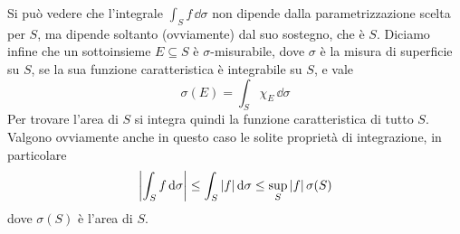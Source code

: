 Si può vedere che l'integrale $\int_Sf\,\dd\sigma$ non dipende dalla parametrizzazione scelta per $S$, ma dipende soltanto (ovviamente) dal suo sostegno, che è $S$.
Diciamo infine che un sottoinsieme $E\subseteq S$ è $\sigma$-misurabile, dove $\sigma$ è la misura di superficie su $S$, se la sua funzione caratteristica è integrabile su $S$, e vale
\begin{equation}
	\sigma(E)=\int_S\chi_E\,\dd\sigma
\end{equation}
Per trovare l'area di $S$ si integra quindi la funzione caratteristica di tutto $S$.
Valgono ovviamente anche in questo caso le solite proprietà di integrazione, in particolare
\begin{equation}
	\left|{\int_Sf\,\textup{d}\sigma}\right|\leq\int_S\left|{f}\right|\textup{d}\sigma\leq\sup_S\left|{f}\right|\sigma(S)
\end{equation}
dove $\sigma(S)$ è l'area di $S$.

